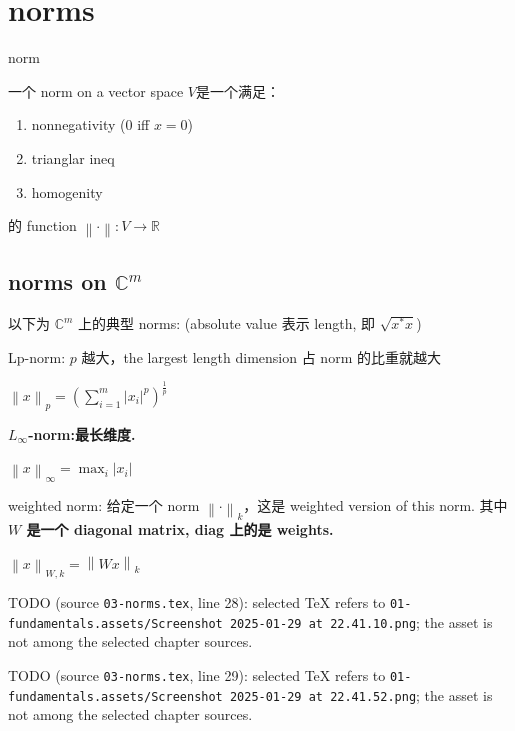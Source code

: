 \chapter{norms}

\begin{definition}{norm}

一个 norm on a vector space \(V\)是一个满足：

\begin{enumerate}
\tightlist
\item
  nonnegativity (0 iff \(x = 0\))
\item
  trianglar ineq
\item
  homogenity
\end{enumerate}

的 function \(\left\| \cdot \right\|:V\rightarrow\mathbb{R}\)

\end{definition}

\section{\texorpdfstring{norms on \(\mathbb{C}^{m}\)}{norms on \textbackslash mathbb\{C\}\^{}\{m\}}}

\begin{example}

以下为 \(\mathbb{C}^{m}\) 上的典型 norms: (absolute value 表示 length, 即 \(\sqrt{x^{\ast}x}\))

Lp-norm: \(p\) 越大，the largest length dimension 占 norm 的比重就越大

\(\left\| x \right\|_{p} = \left( {\sum_{i = 1}^{m}\left| x_{i} \right|^{p}} \right)^{\frac{1}{p}}\)

\textbf{\(L_{\infty}\)-norm:最长维度.}

\(\left\| x \right\|_{\infty} = \max_{i}\left| x_{i} \right|\)

weighted norm: 给定一个 norm \(\left\| \cdot \right\|_{k}\)，这是 weighted version of this norm. 其中 \textbf{\(W\) 是一个 diagonal matrix, diag 上的是 weights.}

\(\left\| x \right\|_{W,k} = \left\| {Wx} \right\|_{k}\)

TODO (source \texttt{03-norms.tex}, line 28): selected TeX refers to \texttt{01-fundamentals.assets/Screenshot\ 2025-01-29\ at\ 22.41.10.png}; the asset is not among the selected chapter sources.

TODO (source \texttt{03-norms.tex}, line 29): selected TeX refers to \texttt{01-fundamentals.assets/Screenshot\ 2025-01-29\ at\ 22.41.52.png}; the asset is not among the selected chapter sources.

\end{example}

